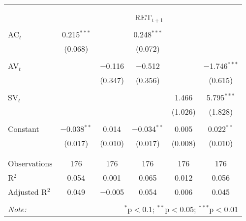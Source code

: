 
\begin{tabular}{@{\extracolsep{5pt}}lccccc} 
\\[-1.8ex]\hline 
\hline \\[-1.8ex] 
\\[-1.8ex] & \multicolumn{5}{c}{RET$_{t+1}$} \\ 
\hline \\[-1.8ex] 
 AC$_{t}$ & 0.215$^{***}$ &  & 0.248$^{***}$ &  &  \\ 
  & (0.068) &  & (0.072) &  &  \\ 
  & & & & & \\ 
 AV$_{t}$ &  & $-$0.116 & $-$0.512 &  & $-$1.746$^{***}$ \\ 
  &  & (0.347) & (0.356) &  & (0.615) \\ 
  & & & & & \\ 
 SV$_{t}$ &  &  &  & 1.466 & 5.795$^{***}$ \\ 
  &  &  &  & (1.026) & (1.828) \\ 
  & & & & & \\ 
 Constant & $-$0.038$^{**}$ & 0.014 & $-$0.034$^{**}$ & 0.005 & 0.022$^{**}$ \\ 
  & (0.017) & (0.010) & (0.017) & (0.008) & (0.010) \\ 
  & & & & & \\ 
\hline \\[-1.8ex] 
Observations & 176 & 176 & 176 & 176 & 176 \\ 
R$^{2}$ & 0.054 & 0.001 & 0.065 & 0.012 & 0.056 \\ 
Adjusted R$^{2}$ & 0.049 & $-$0.005 & 0.054 & 0.006 & 0.045 \\ 
\hline 
\hline \\[-1.8ex] 
\textit{Note:}  & \multicolumn{5}{r}{$^{*}$p$<$0.1; $^{**}$p$<$0.05; $^{***}$p$<$0.01} \\ 
\end{tabular} 
